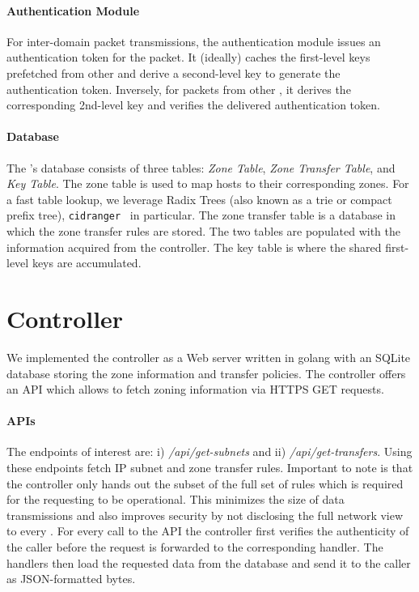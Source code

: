 \paragraph{Authentication Module}
For inter-domain packet transmissions, the authentication module issues an 
authentication token for the packet. It (ideally) caches the first-level keys prefetched
from other \tps and derive a second-level key to generate the authentication token. 
Inversely, for packets from other \tps, it derives the corresponding 2nd-level key
and verifies the delivered authentication token.

\paragraph{Database}
The \tp's database consists of three tables: \textit{Zone Table}, \textit{Zone Transfer 
Table}, and \textit{Key Table}. The zone table is used to map hosts to their corresponding 
zones. For a fast table lookup, we leverage Radix Trees (also known as a trie or compact prefix 
tree), \texttt{cidranger}~\cite{cidranger} in particular. The zone transfer table is a database 
in which the zone transfer rules are stored. The two tables are populated with the information 
acquired from the controller. The key table is where the shared first-level keys are 
accumulated. 

\section{Controller}
\label{sec:controller}

We implemented the controller as a Web server written in golang with an SQLite database storing the 
zone information and transfer policies. The controller offers an API which allows
\tps to fetch zoning information via HTTPS GET requests.

\paragraph{APIs}
The endpoints of interest are: i) \textit{/api/get-subnets} and ii) \textit{/api/get-transfers}.
Using these endpoints \tps fetch IP subnet and zone transfer rules. Important to note is that 
the controller only hands out the subset of the full set of rules which is required for the 
requesting \tp to be operational. This minimizes the size of data transmissions and also 
improves security by not disclosing the full network view to every \tp. For every call to the 
API the controller first verifies the authenticity of the caller before the request is forwarded 
to the corresponding handler. The handlers then load the requested data from the database and 
send it to the caller as JSON-formatted bytes.

